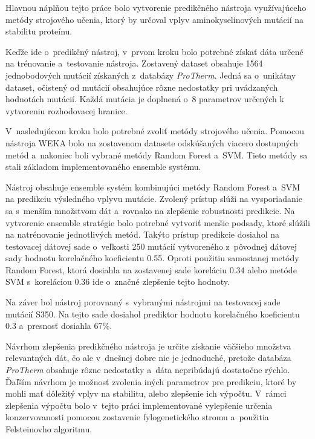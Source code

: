 Hlavnou náplňou tejto práce bolo vytvorenie predikčného nástroja využívajúceho metódy strojového učenia, ktorý by určoval vplyv aminokyselinových mutácií na stabilitu proteínu.

Keďže ide o~predikčný nástroj, v~prvom kroku bolo potrebné získať dáta určené na trénovanie a~testovanie nástroja. Zostavený dataset obsahuje 1564 jednobodových mutácií získaných z~databázy \textit{ProTherm}. Jedná sa o~unikátny dataset, očistený od mutácií obsahujúce rôzne nedostatky pri uvádzaných hodnotách mutácií. Každá mutácia je doplnená o~8 parametrov určených k vytvoreniu rozhodovacej hranice.

V~nasledujúcom kroku bolo potrebné zvoliť metódy strojového učenia. Pomocou nástroja WEKA bolo na zostavenom datasete odskúšaných viacero dostupných metód a~nakoniec boli vybrané metódy Random Forest a~SVM. Tieto metódy sa stali základom implementovaného ensemble systému.

Nástroj obsahuje ensemble systém kombinujúci metódy Random Forest a~SVM na predikciu výsledného vplyvu mutácie. Zvolený prístup slúži na vysporiadanie sa s~menším množstvom dát a~rovnako na zlepšenie robustnosti predikcie. 
Na vytvorenie ensemble stratégie bolo potrebné vytvoriť menšie podsady, ktoré slúžili na natrénovanie jednotlivých metód. Takýto prístup predikcie dosiahol na testovacej dátovej sade o~veľkosti 250 mutácií vytvoreného z~pôvodnej dátovej sady hodnotu korelačného koeficientu 0.55. Oproti použitiu samostanej metódy Random Forest, ktorá dosiahla na zostavenej sade koreláciu 0.34 alebo metóde SVM s~koreláciou 0.36 ide o~značné zlepšenie tejto hodnoty.

Na záver bol nástroj porovnaný s~vybranými nástrojmi na testovacej sade mutácií S350. Na tejto sade dosiahol prediktor hodnotu korelačného koeficientu 0.3 a~presnosť dosiahla 67\%.

Návrhom zlepšenia predikčného nástroja je určite získanie väčšieho množstva relevantných dát, čo ale v~dnešnej dobre nie je jednoduché, pretože databáza \textit{ProTherm} obsahuje rôzne nedostatky a~dáta nepribúdajú dostatočne rýchlo. 
Ďaľším návrhom je možnosť zvolenia iných parametrov pre predikciu, ktoré by mohli mať dôležitý vplyv na stabilitu, alebo zlepšenie ich výpočtu. V~rámci zlepšenia výpočtu bolo v~tejto práci implementované vylepšenie určenia konzervovanosti pomocou zostavenie fylogenetického stromu a~použitia Felsteinovho algoritmu.

